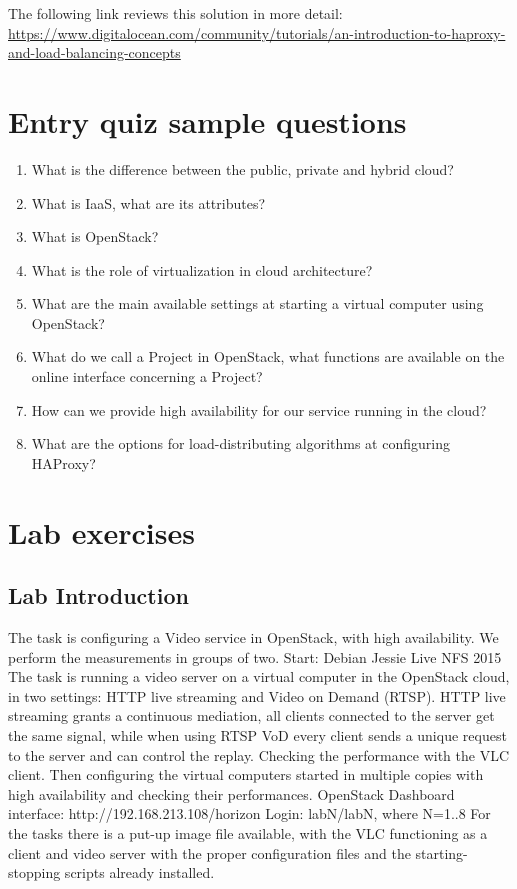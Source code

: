 \documentclass[a4paper]{article}
\begin{document}
The following link reviews this solution in more detail:
\url{https://www.digitalocean.com/community/tutorials/an-introduction-to-haproxy-and-load-balancing-concepts}

\appendix

\section{Entry quiz sample questions}

\begin{enumerate}
    \item What is the difference between the public, private and hybrid cloud?
    \item What is IaaS, what are its attributes?
    \item What is OpenStack?
    \item What is the role of virtualization in cloud architecture?
    \item What are the main available settings at starting a virtual computer using OpenStack?
    \item What do we call a Project in OpenStack, what functions are available on the online interface concerning a
          Project?
    \item How can we provide high availability for our service running in the cloud?
    \item What are the options for load-distributing algorithms at configuring HAProxy?
\end{enumerate}

\section{Lab exercises}

\subsection{Lab Introduction}

The task is configuring a Video service in OpenStack, with high availability. We perform the measurements in groups of
two. Start: Debian Jessie Live NFS 2015
The task is running a video server on a virtual computer in the OpenStack cloud, in two settings: HTTP live streaming
and Video on Demand (RTSP). HTTP live streaming grants a continuous mediation, all clients connected to the server get
the same signal, while when using RTSP VoD every client sends a unique request to the server and can control the
replay.
Checking the performance with the VLC client. Then configuring the virtual computers started in multiple copies with
high availability and checking their performances.
OpenStack Dashboard interface: http://192.168.213.108/horizon
Login: labN/labN, where N=1..8
For the tasks there is a put-up image file available, with the VLC functioning as a client and video server with the
proper configuration files and the starting-stopping scripts already installed.
\end{document}
